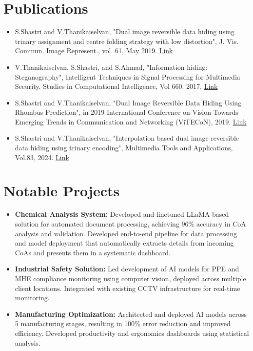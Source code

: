 \documentclass[a4paper,11pt]{article}
\begin{document}
\section{Publications}
	\begin{itemize}[leftmargin=*, itemsep = -4pt]
    \item{S.Shastri and V.Thanikaiselvan, "Dual image reversible data hiding using trinary assignment and centre folding strategy with low distortion", J. Vis. Commun. Image Represent., vol. 61, May 2019. \href{https://doi.org/10.1016/j.jvcir.2019.03.022}{Link}}
		\item{V.Thanikaiselvan, S.Shastri, and S.Ahmad, "Information hiding: Steganography", Intelligent Techniques in Signal Processing for Multimedia Security. Studies in Computational Intelligence, Vol 660. 2017. \href{https://doi.org/10.1007/978-3-319-44790-2_4}{Link}}
    \item{S.Shastri and V.Thanikaiselvan, "Dual Image Reversible Data Hiding Using Rhombus Prediction", in 2019 International Conference on Vision Towards Emerging Trends in Communication and Networking (ViTECoN), 2019. \href{https://doi.org/10.1109/ViTECoN.2019.8899667}{Link}}
    \item{S.Shastri and V.Thanikaiselvan, "Interpolation based dual image reversible data hiding using trinary encoding", Multimedia Tools and Applications, Vol.83, 2024. \href{https://doi.org/10.1007/s11042-023-15574-9}{Link}}
   \end{itemize}

\section{Notable Projects}
  \begin{itemize}[leftmargin=*, itemsep = -2pt]
    \item {\textbf{Chemical Analysis System:} Developed and finetuned LLaMA-based solution for automated document processing, achieving 96\% accuracy in CoA analysis and validation. Developed end-to-end pipeline for data processing and model deployment  that automatically extracts details from incoming CoAs and presents them in a systematic dashboard.}
    \item {\textbf{Industrial Safety Solution:} Led development of AI models for PPE and MHE compliance monitoring using computer vision, deployed across multiple client locations. Integrated with existing CCTV infrastructure for real-time monitoring.}
    \item {\textbf{Manufacturing Optimization:} Architected and deployed AI models across 5 manufacturing stages, resulting in 100\% error reduction and improved efficiency. Developed productivity and ergonomics dashboards using statistical analysis.}
  \end{itemize}
\end{document}
